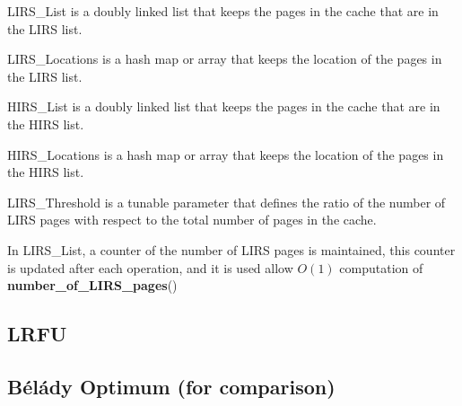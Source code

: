 LIRS\_List is a doubly linked list that keeps the pages in the cache that are in the LIRS list.

LIRS\_Locations is a hash map or array that keeps the location of the pages in the LIRS list.

HIRS\_List is a doubly linked list that keeps the pages in the cache that are in the HIRS list.

HIRS\_Locations is a hash map or array that keeps the location of the pages in the HIRS list.

LIRS\_Threshold is a tunable parameter that defines the ratio of the number of LIRS pages with 
respect to the total number of pages in the cache.

In LIRS\_List, a counter of the number of LIRS pages is maintained, this counter is updated after 
each operation, and it is used allow $O(1)$ computation of \textbf{number\_of\_LIRS\_pages}()

\subsection{LRFU}

\subsection{Bélády Optimum (for comparison)}